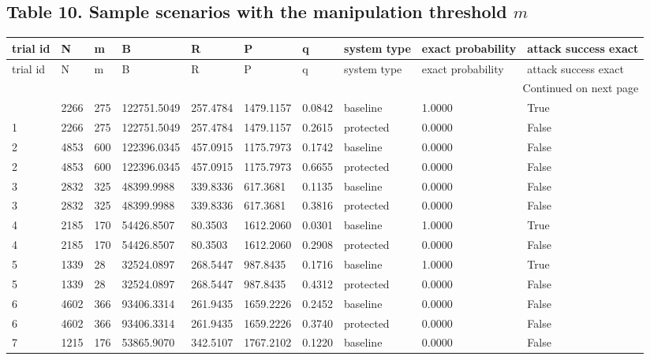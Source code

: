 \documentclass[11pt,a4paper]{article}
\begin{document}
\begin{landscape}
\subsection*{Table 10. Sample scenarios with the manipulation threshold $m$}
{\tiny
\setlength{\tabcolsep}{3pt}
\begin{longtable}{llllllllll}
\toprule
trial id & N & m & B & R & P & q & system type & exact probability & attack success exact \\
\midrule
\endfirsthead
\toprule
trial id & N & m & B & R & P & q & system type & exact probability & attack success exact \\
\midrule
\endhead
\midrule
\multicolumn{10}{r}{Continued on next page} \\
\midrule
\endfoot
\bottomrule
\endlastfoot
1 & 2266 & 275 & 122751.5049 & 257.4784 & 1479.1157 & 0.0842 & baseline & 1.0000 & True \\
1 & 2266 & 275 & 122751.5049 & 257.4784 & 1479.1157 & 0.2615 & protected & 0.0000 & False \\
2 & 4853 & 600 & 122396.0345 & 457.0915 & 1175.7973 & 0.1742 & baseline & 0.0000 & False \\
2 & 4853 & 600 & 122396.0345 & 457.0915 & 1175.7973 & 0.6655 & protected & 0.0000 & False \\
3 & 2832 & 325 & 48399.9988 & 339.8336 & 617.3681 & 0.1135 & baseline & 0.0000 & False \\
3 & 2832 & 325 & 48399.9988 & 339.8336 & 617.3681 & 0.3816 & protected & 0.0000 & False \\
4 & 2185 & 170 & 54426.8507 & 80.3503 & 1612.2060 & 0.0301 & baseline & 1.0000 & True \\
4 & 2185 & 170 & 54426.8507 & 80.3503 & 1612.2060 & 0.2908 & protected & 0.0000 & False \\
5 & 1339 & 28 & 32524.0897 & 268.5447 & 987.8435 & 0.1716 & baseline & 1.0000 & True \\
5 & 1339 & 28 & 32524.0897 & 268.5447 & 987.8435 & 0.4312 & protected & 0.0000 & False \\
6 & 4602 & 366 & 93406.3314 & 261.9435 & 1659.2226 & 0.2452 & baseline & 0.0000 & False \\
6 & 4602 & 366 & 93406.3314 & 261.9435 & 1659.2226 & 0.3740 & protected & 0.0000 & False \\
7 & 1215 & 176 & 53865.9070 & 342.5107 & 1767.2102 & 0.1220 & baseline & 0.0000 & False \\

\end{longtable}}
\end{landscape}
\end{document}
